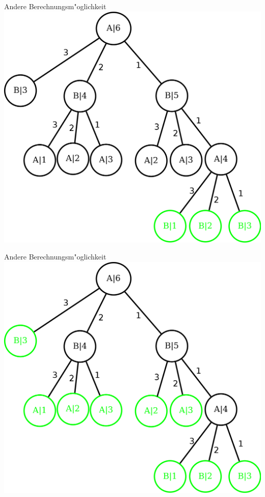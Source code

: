 \documentclass[18pt]{beamer}
\begin{document}
\begin{frame}{Andere Berechnungsm"oglichkeit}
\includegraphics[scale=0.4]{baum3.png}
\end{frame}

\begin{frame}{Andere Berechnungsm"oglichkeit}
\includegraphics[scale=0.4]{baum4.png}
\end{frame}
\end{document}

